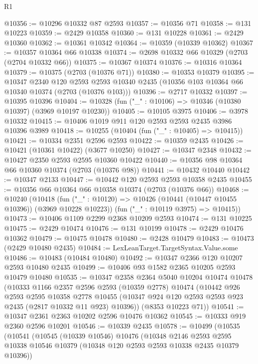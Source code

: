 \begin{lexlean}{R1}
\begin{coremodule}
@10356 := @10296 @10332 @87 @2593
@10357 := @10356 @71
@10358 := @131 @10223
@10359 := @2429 @10358
@10360 := @131 @10228
@10361 := @2429 @10360
@10362 := @10361 @10342
@10364 := @10359 (@10339 @10362)
@10367 := @10357 @10364 @66 @10338
@10374 := @2698 @10332 @66 @10329 (@2703 (@2704 @10332 @66))
@10375 := @10367 @10374
@10376 := @10316 @10364
@10379 := @10375 (@2703 (@10376 @71))
@10380 := @10353 @10379
@10395 := @10347
    @2340
    @120
    @2593
    @2593
    @10340
    @2435
    (@10356 @103 @10364 @66 @10340 @10374 (@2703 (@10376 @103)))
@10396 := @2717 @10332
@10397 := @10395 @10396
@10404 := @10328 (fun ("_" : @10106) => @10346 (@10380 @10397) (@3969 @10197 @10230))
@10405 := @10105 @3975
@10406 := @3978 @10332
@10415 := @10406 @1019 @911 @120 @2593 @2593 @2435 @3986 @10396 @3989
@10418 := @10255 (@10404 (fun ("_" : @10405) => @10415))
@10421 := @10334 @2351 @2596 @2593
@10422 := @10359 @2435
@10426 := @10421 (@10361 @10422) (@3677 @10250)
@10427 := @10347 @2348
@10432 := @10427 @2350 @2593 @2595 @10360 @10422
@10440 := @10356 @98 @10364 @66 @10360 @10374 (@2703 (@10376 @98))
@10441 := @10432 @10440
@10442 := @10347 @2133
@10447 := @10442 @120 @2593 @2593 @10358 @2435
@10455 := @10356 @66 @10364 @66 @10358 @10374 (@2703 (@10376 @66))
@10468 := @10240
    (@10418
      (fun ("_" : @10120) => @10426 (@10441 (@10447 @10455 @10396)) (@3969 @10228 @10223))
      (fun ("_" : @10119 @3975) => @10415))
@10473 := @10406 @1109 @2299 @2368 @10209 @2593
@10474 := @131 @10225
@10475 := @2429 @10474
@10476 := @131 @10199
@10478 := @2429 @10476 @10362
@10479 := @10475 @10478
@10480 := @2428 @10479
@10483 := @10473 (@2429 @10480 @2435)
@10484 := LexLeanTarget.TargetSyntax.Value.some
@10486 := @10483 (@10484 @10480)
@10492 := @10347 @2366 @120 @10207 @2593 @10480 @2435
@10499 := @10406 @93 @1582 @2365 @10205 @2593 @10479 @10480
@10535 := @10347
    @2358
    @2364
    @5040
    @10204
    @10474
    @10478
    (@10333
      @1166
      @2357
      @2596
      @2593
      (@10359 @2778)
      @10474
      (@10442
        @926
        @2593
        @2595
        @10358
        @2778
        @10455
        (@10347 @924 @120 @2593 @2593 @923 @2435 (@2817 @10332 @11 @923) @10396))
      (@8353 @10223 @71))
@10541 := @10347 @2361 @2363 @10202 @2596 @10476 @10362
@10545 := @10333 @919 @2360 @2596 @10201
@10546 := @10339 @2435
@10578 := @10499
    (@10535
      (@10541
        (@10545
          (@10339 @10546)
          @10476
          (@10348
            @2146
            @2593
            @2595
            @10338
            @10546
            @10379
            (@10348 @120 @2593 @2593 @10338 @2435 @10379 @10396))

\end{coremodule}
\end{lexlean}
